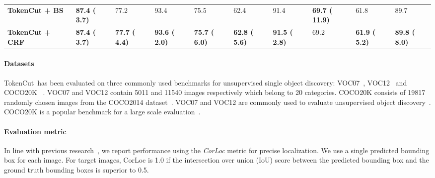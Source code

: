 \documentclass[twocolumn]{article}
\newcommand{\name} {TokenCut}
\begin{document}
\begin{table*}[!ht]
{\begin{tabular}{l|lll|lll|lll}
\bf TokenCut + BS~\cite{barron2016fast} & \bf 87.4 (\textcolor{cssgreen}{ \bf 3.7}) &  77.2 & 93.4 &  75.5 &	 62.4 &  91.4 & \bf 69.7 (\textcolor{cssgreen}{ \bf 11.9}) &  61.8 &  89.7 \\
\bf TokenCut + CRF~\cite{krahenbuhl2011efficient} & \bf 87.4 (\textcolor{cssgreen}{ \bf 3.7})	& \bf 77.7 (\textcolor{cssgreen}{ \bf 4.4})	& \bf93.6 (\textcolor{cssgreen}{ \bf 2.0})	& \bf 75.7 (\textcolor{cssgreen}{ \bf 6.0}) &	\bf 62.8 (\textcolor{cssgreen}{ \bf 5.6})& \bf 91.5 (\textcolor{cssgreen}{ \bf 2.8}) & 69.2 &	\bf 61.9 (\textcolor{cssgreen}{ \bf 5.2}) & \bf 89.8 (\textcolor{cssgreen}{ \bf 8.0}) \\


\bottomrule
\end{tabular}
}
\label{tab:salient_detection}
\end{table*}

\paragraph*{Datasets}
\name~has been evaluated on three commonly used benchmarks for unsupervised single object discovery: VOC07~\cite{pascal-voc-2007}, VOC12~\cite{pascal-voc-2012} and COCO20K ~\cite{lin2014microsoft,vo2020toward}. 
VOC07 and VOC12 contain 5011 and 11540 images respectively which belong to 20 categories. COCO20K consists of 19817 randomly chosen images from the COCO2014 dataset~\cite{lin2014microsoft}. VOC07 and VOC12 are commonly used to evaluate unsupervised object discovery~\cite{vo2020toward,vo2021large,vo2019unsupervised, wei2019unsupervised,cho2015unsupervised}. COCO20K is a popular benchmark for a large scale evaluation~\cite{vo2020toward}.


\paragraph*{Evaluation metric}
In line with previous research~\cite{deselaers2010localizing, vo2020toward,vo2021large,vo2019unsupervised, wei2019unsupervised,cho2015unsupervised,siva2013looking},
we report performance using the \emph{CorLoc} metric for precise localization. We use a single predicted bounding box for each image. For target images, CorLoc is 1.0 if the intersection over union (IoU) score between the predicted bounding box and the ground truth bounding boxes is superior to 0.5.
\end{document}
